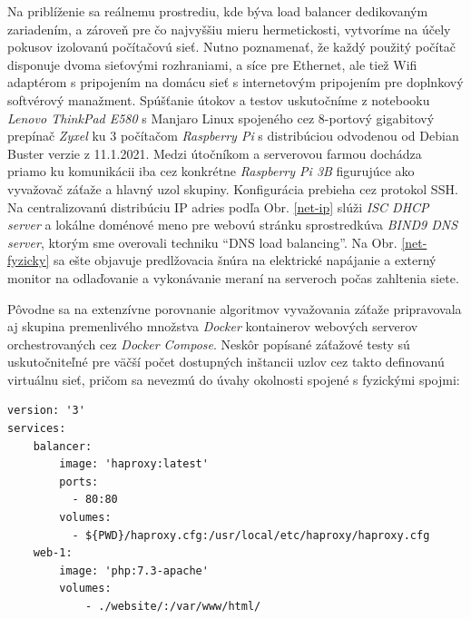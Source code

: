 \documentclass[12pt, a4paper]{article}
\begin{document}
Na priblíženie sa reálnemu prostrediu, kde býva load balancer dedikovaným zariadením, a zároveň pre čo 
najvyššiu mieru hermetickosti, vytvoríme na účely pokusov izolovanú počítačovú sieť. Nutno poznamenať, že 
každý použitý počítač disponuje dvoma sieťovými rozhraniami, a síce pre Ethernet, ale tiež Wifi adaptérom s 
pripojením na domácu sieť s internetovým pripojením pre doplnkový softvérový manažment. Spúšťanie
útokov a testov uskutočníme z notebooku \emph{Lenovo ThinkPad E580} s Manjaro Linux spojeného cez 8-portový 
gigabitový prepínač \emph{Zyxel} ku 3 počítačom \emph{Raspberry Pi} s distribúciou odvodenou od Debian Buster
verzie z 11.1.2021. Medzi útočníkom a serverovou farmou dochádza priamo ku komunikácii iba
cez konkrétne \emph{Raspberry Pi 3B} figurujúce ako vyvažovač záťaže a hlavný uzol skupiny. Konfigurácia
prebieha cez protokol SSH. Na centralizovanú distribúciu IP adries podľa Obr. \ref{net-ip} slúži 
\emph{ISC DHCP server} a lokálne doménové meno pre webovú stránku sprostredkúva \emph{BIND9 DNS server}, 
ktorým sme overovali techniku \enquote{DNS load balancing}. Na Obr. \ref{net-fyzicky} sa ešte objavuje 
predlžovacia šnúra na elektrické napájanie a externý monitor na odlaďovanie a vykonávanie meraní 
na serveroch počas zahltenia siete.

Pôvodne sa na extenzívne porovnanie algoritmov vyvažovania záťaže pripravovala aj skupina premenlivého
množstva \emph{Docker} kontainerov webových serverov orchestrovaných cez \emph{Docker Compose}. Neskôr
popísané záťažové testy sú uskutočniteľné pre väčší počet dostupných inštancii uzlov cez takto 
definovanú virtuálnu sieť, pričom sa nevezmú do úvahy okolnosti spojené s fyzickými spojmi:

\begin{lstlisting}[caption=Vyvažovanie Apache inštancii cez HAProxy v docker-compose.yml, 
basicstyle=\ttfamily\scriptsize]
version: '3'
services:
    balancer:
        image: 'haproxy:latest'
        ports:
          - 80:80
        volumes:
          - ${PWD}/haproxy.cfg:/usr/local/etc/haproxy/haproxy.cfg
    web-1:
        image: 'php:7.3-apache'
        volumes:
            - ./website/:/var/www/html/
\end{lstlisting}
\end{document}
